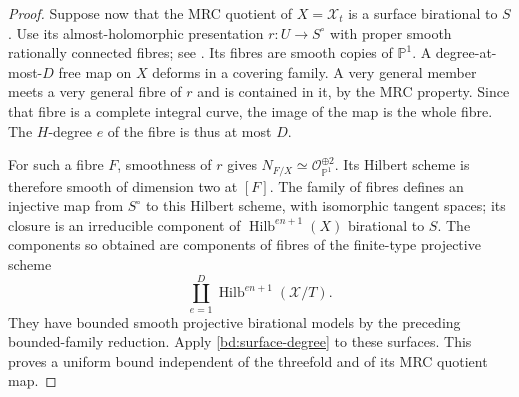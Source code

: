 \begin{proof}
Suppose now that the MRC quotient of $X=\mathcal X_t$ is a surface
birational to $S$.  Use its almost-holomorphic presentation
$r:U\to S^\circ$ with proper smooth rationally connected fibres;
see \cite[Chapter~IV, Section~5]{Kollar96}.
Its fibres are smooth copies of $\mathbb P^1$.  A degree-at-most-$D$
free map on $X$ deforms in a covering family.  A very general member
meets a very general fibre of $r$ and is contained in it, by the MRC
property.  Since that fibre is a complete integral curve, the image of
the map is the whole fibre.  The $H$-degree $e$ of the fibre is thus at
most $D$.

For such a fibre $F$, smoothness of $r$ gives
$N_{F/X}\simeq\mathcal O_{\mathbb P^1}^{\oplus2}$.  Its Hilbert scheme
is therefore smooth of dimension two at $[F]$.  The family of fibres
defines an injective map from $S^\circ$ to this Hilbert scheme, with
isomorphic tangent spaces; its closure is an irreducible component of
$\operatorname{Hilb}^{en+1}(X)$ birational to $S$.  The components so
obtained are components of fibres of the finite-type projective scheme
\[
              \coprod_{e=1}^{D}
                 \operatorname{Hilb}^{en+1}(\mathcal X/T).
\]
They have bounded smooth projective birational models by the preceding
bounded-family reduction.  Apply \eqref{bd:surface-degree} to these
surfaces.  This proves a uniform bound independent of the threefold and
of its MRC quotient map.
\end{proof}

